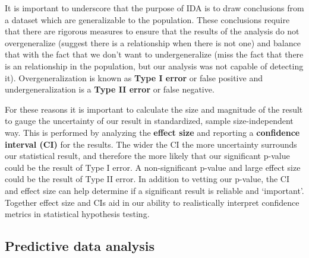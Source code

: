 \documentclass[
  letterpaper,
]{latex/krantz}
\begin{document}
It is important to underscore that the purpose of IDA is to draw
conclusions from a dataset which are generalizable to the population.
These conclusions require that there are rigorous measures to ensure
that the results of the analysis do not overgeneralize (suggest there is
a relationship when there is not one) and balance that with the fact
that we don't want to undergeneralize (miss the fact that there is an
relationship in the population, but our analysis was not capable of
detecting it). Overgeneralization is known as \textbf{Type I error} or
false positive and undergeneralization is a \textbf{Type II error} or
false negative.

For these reasons it is important to calculate the size and magnitude of
the result to gauge the uncertainty of our result in standardized,
sample size-independent way. This is performed by analyzing the
\textbf{effect size} and reporting a \textbf{confidence interval (CI)}
for the results. The wider the CI the more uncertainty surrounds our
statistical result, and therefore the more likely that our significant
p-value could be the result of Type I error. A non-significant p-value
and large effect size could be the result of Type II error. In addition
to vetting our p-value, the CI and effect size can help determine if a
significant result is reliable and `important'. Together effect size and
CIs aid in our ability to realistically interpret confidence metrics in
statistical hypothesis testing.

\hypertarget{predictive-data-analysis}{%
\subsection{Predictive data analysis}\label{predictive-data-analysis}}
\end{document}
